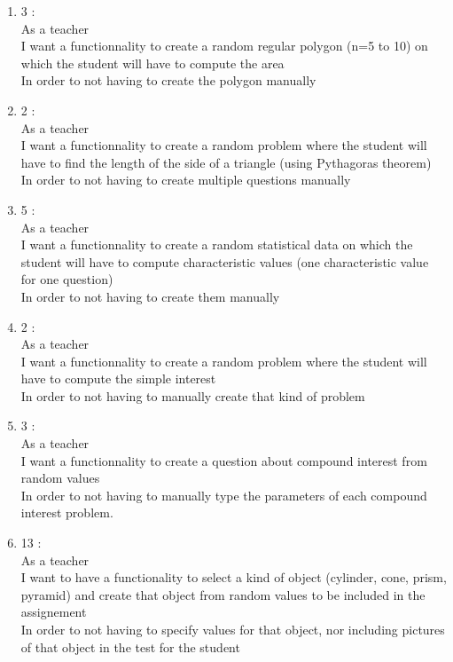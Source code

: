 \documentclass{article}
\begin{document}
\begin{enumerate}
    \item 3 :\\ %
    As a teacher\\
    I want a functionnality to create a random regular polygon (n=5 to 10) on which the student will have to compute the area\\
    In order to not having to create the polygon manually\\
    
    \item 2 :\\ %
    As a teacher\\
    I want a functionnality to create a random problem where the student will have to find the length of the side of a triangle (using Pythagoras theorem)\\
    In order to not having to create multiple questions manually \\
    
    \item 5 :\\ %
    As a teacher\\
    I want a functionnality to create a random statistical data on which the student will have to compute characteristic values (one characteristic value for one question)\\
    In order to not having to create them manually\\
    
    \item 2 :\\ %
    As a teacher\\
    I want a functionnality to create a random problem where the student will have to compute the simple interest\\
    In order to not having to manually create that kind of problem\\
         
    \item 3 :\\ %
    As a teacher\\
    I want a functionnality to create a question about compound interest from random values\\
    In order to not having to manually type the parameters of each compound interest problem.\\
    
    \item 13 : \\ %
    As a teacher\\
    I want to have a functionality to select a kind of object (cylinder, cone, prism, pyramid) and create that object from random values to be included in the assignement\\
    In order to not having to specify values for that object, nor including pictures of that object in the test for the student\\

\end{enumerate}
\end{document}
